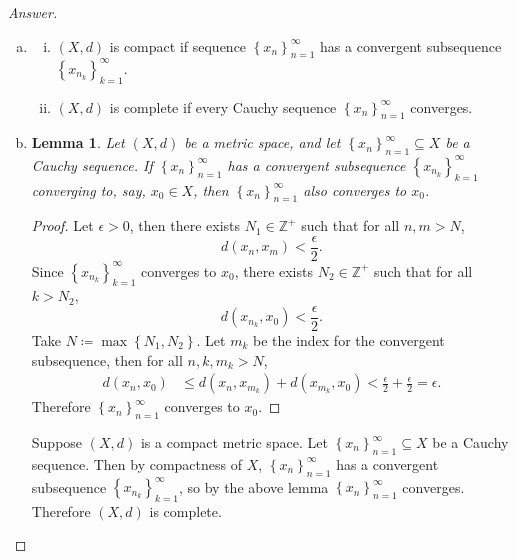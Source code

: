 \documentclass[12pt]{article}
\newcommand{\z}{\mathbb{Z}}
\newcommand\paren[1]{\left( #1 \right)}
\newcommand\setb[1]{\left \{ #1 \right \}}
\newtheorem{lemma}[theorem]{Lemma}
\theoremstyle{definition}
\begin{document}
\begin{proof}[Answer]
    \noindent
    \begin{enumerate}[(a)]
        \item 
        \begin{enumerate}[(i)]
            \item $(X,d)$ is compact if sequence $\setb{ x_n }_{n = 1}^{\infty}$ has a convergent subsequence $\setb{ x_{n_k} }_{k = 1}^{\infty}$.
            \item $(X,d)$ is complete if every Cauchy sequence $\setb{ x_n }_{n = 1}^{\infty}$ converges.
        \end{enumerate}
        \item 
        \begin{lemma}
            Let $(X,d)$ be a metric space, and let $\setb{ x_n }_{n=1}^{\infty} \subseteq X$ be a Cauchy sequence. If $\setb{ x_n }_{n=1}^{\infty}$ has a convergent subsequence $\setb{ x_{n_k} }_{k=1}^{\infty}$ converging to, say, $x_0 \in X$, then $\setb{ x_n }_{n=1}^{\infty}$ also converges to $x_0$. 
        \end{lemma}
        \begin{proof}
            Let $\epsilon > 0$, then there exists $N_1 \in \z^+$ such that for all $n , m > N$,
            \[
                d(x_n,x_m) < \frac{\epsilon}{2}.
            \]
            Since $\setb{ x_{n_k} }_{k=1}^{\infty}$ converges to $x_0$, there exists $N_2 \in \z^+$ such that for all $k > N_2$, 
            \[
                d \paren{ x_{n_k} , x_0 } < \frac{\epsilon}{2}.
            \]
            Take $N \coloneqq \max \setb{N_1,N_2}$. Let $m_k$ be the index for the convergent subsequence, then for all $n , k , m_k > N$,
            \begin{align*}
                d(x_n,x_0) & \leq d \paren{ x_n , x_{m_k} } + d \paren{ x_{m_k} , x_0 } < \frac{\epsilon}{2} + \frac{\epsilon}{2} = \epsilon.
            \end{align*}
            Therefore $\setb{ x_n }_{n=1}^{\infty}$ converges to $x_0$.
        \end{proof}
        Suppose $(X,d)$ is a compact metric space. Let $\setb{ x_n }_{n = 1}^{\infty} \subseteq X$ be a Cauchy sequence. Then by compactness of $X$, $\setb{ x_n }_{n = 1}^{\infty}$ has a convergent subsequence $\setb{ x_{n_k} }_{k = 1}^{\infty}$, so by the above lemma $\setb{ x_n }_{n = 1}^{\infty}$ converges. Therefore $(X,d)$ is complete.
    \end{enumerate}
\end{proof}
\end{document}
